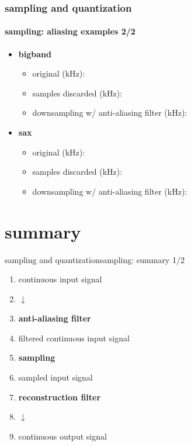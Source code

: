 		\begin{frame}\frametitle{sampling and quantization}\framesubtitle{sampling: aliasing examples 2/2}
            \begin{itemize}
                \item \textbf{bigband}
                \begin{itemize}
                    \item   original (\unit[48]{kHz}): 
                    \item   samples discarded (\unit[6]{kHz}): 
                    \item   downsampling  w/ anti-aliasing filter (\unit[6]{kHz}): 
                \end{itemize}
                \pause
                \bigskip
                \item   \textbf{sax}
                \begin{itemize}
                    \item   original (\unit[48]{kHz}): 
                    \item   samples discarded (\unit[6]{kHz}): 
                    \item   downsampling w/ anti-aliasing filter (\unit[6]{kHz}): 
                \end{itemize}
            \end{itemize}
		\end{frame}

	\section{summary}	
		\begin{frame}{sampling and quantization}{sampling: summary 1/2}
			\begin{enumerate}
				\item[]   continuous input signal
                \item[] \hspace{10mm}$\downarrow$
				\pause
				\item   \textbf{anti-aliasing filter}
				\pause
                \smallskip
				\item[] filtered continuous input signal
				\pause
				\item   \textbf{sampling}
				\pause
                \smallskip
				\item[] sampled input signal
				\pause
                \smallskip
				\item   \textbf{reconstruction filter}
				\pause
                \item[] \hspace{10mm}$\downarrow$
				\item[] continuous output signal
			\end{enumerate}
		\end{frame}
 
